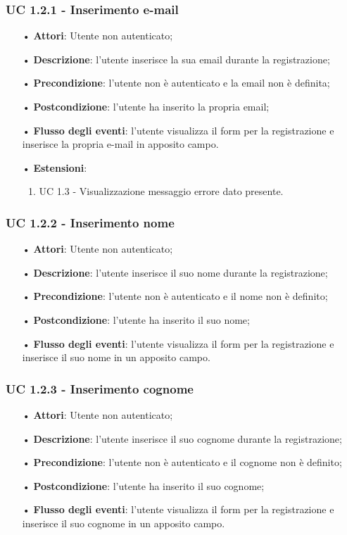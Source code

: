 \subsubsection{UC 1.2.1 - Inserimento e-mail}
\begin{itemize}
	\item[•]\textbf{Attori}: Utente non autenticato;
	\item[•]\textbf{Descrizione}: l'utente inserisce la sua email durante la registrazione;
	\item[•]\textbf{Precondizione}: l'utente non è autenticato e la email non è definita;
	\item[•]\textbf{Postcondizione}: l'utente ha inserito la propria email;
	\item[•]\textbf{Flusso degli eventi}: l'utente visualizza il form per la registrazione e inserisce la propria e-mail in apposito campo.
	\item[•] \textbf{Estensioni}:
		\begin{enumerate}
		\item UC 1.3 - Visualizzazione messaggio errore dato presente.
	\end{enumerate}
\end{itemize}

\subsubsection{UC 1.2.2 - Inserimento nome}
\begin{itemize}
\item[•]\textbf{Attori}: Utente non autenticato;
\item[•]\textbf{Descrizione}: l'utente inserisce il suo nome durante la registrazione;
\item[•]\textbf{Precondizione}: l'utente non è autenticato e il nome non è definito;
\item[•]\textbf{Postcondizione}: l'utente ha inserito il suo nome;
\item[•]\textbf{Flusso degli eventi}: l'utente visualizza il form per la registrazione e inserisce il suo nome in un apposito campo.
\end{itemize}

\subsubsection{UC 1.2.3 - Inserimento cognome}
\begin{itemize}
	\item[•]\textbf{Attori}: Utente non autenticato;
	\item[•]\textbf{Descrizione}: l'utente inserisce il suo cognome durante la registrazione;
	\item[•]\textbf{Precondizione}: l'utente non è autenticato e il cognome non è definito;
	\item[•]\textbf{Postcondizione}: l'utente ha inserito il suo cognome;
	\item[•]\textbf{Flusso degli eventi}: l'utente visualizza il form per la registrazione e inserisce il suo cognome in un apposito campo.
\end{itemize}

